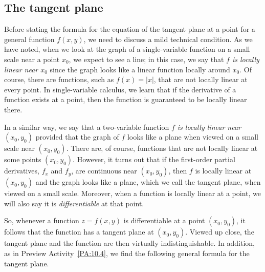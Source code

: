 \subsection*{The tangent plane}



Before stating the formula for the equation of the tangent plane at a point for
a general function $f(x,y)$, we need to discuss a mild technical
condition.   As we have noted, when we look at the graph of a single-variable
function on a small scale near a point $x_0$, we expect to see a line;
in this case, we say that {\em $f$ is locally linear near $x_0$} since
the graph looks like a linear function locally around $x_0$.  Of
course, there are functions, such as $f(x)=|x|$, that are not locally
linear at every point.  In single-variable calculus, we learn that if the derivative of a function exists at a point, 
then the function is guaranteed to be locally linear there.

In a similar way, we say that a two-variable function {\em $f$ is
  locally linear near $(x_0,y_0)$} provided that the graph of $f$ looks like a
plane when viewed on a small scale near $(x_0,y_0)$.  There are, of
course, functions that are not locally linear at some points
$(x_0,y_0)$.  However, it turns out that if the first-order partial derivatives, $f_x$ and $f_y$, are continuous near
$(x_0,y_0)$, then $f$ is locally linear at $(x_0,y_0)$ and the graph
looks like a plane, which we call the tangent plane, when viewed on a
small scale.  Moreover, when a function is locally linear at a point, we will also say it is \emph{differentiable} at that point.

\vspace*{5pt}
\nin {}
\vspace*{5pt}


So, whenever a function $z = f(x,y)$ is differentiable at a point $(x_0,y_0)$, it follows that the function has a tangent plane at $(x_0,y_0)$.  Viewed up close, the tangent plane and the function are then virtually indistinguishable.  In addition, as in Preview Activity~\ref{PA:10.4}, we find the following general formula for the tangent plane.

